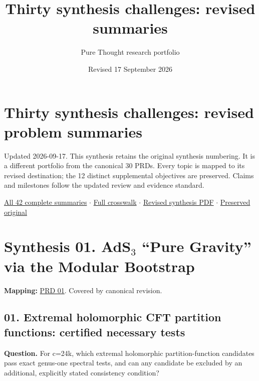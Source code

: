 \documentclass[
  11pt,
]{article}
\title{Thirty synthesis challenges: revised summaries}
\author{Pure Thought research portfolio}
\date{Revised 17 September 2026}
\begin{document}
\maketitle
\thispagestyle{empty}
\clearpage

{
\setcounter{tocdepth}{1}
\tableofcontents
\clearpage
}
\section{Thirty synthesis challenges: revised problem summaries}

Updated 2026-09-17. This synthesis retains the original synthesis
numbering. It is a different portfolio from the canonical 30 PRDs. Every
topic is mapped to its revised destination; the 12 distinct supplemental
objectives are preserved. Claims and milestones follow the updated
review and evidence standard.

\href{https://github.com/rick-stevens-ai/Pure-Thought/blob/main/COMPLETE-PROBLEM-SUMMARIES.md}{All
42 complete summaries} \ensuremath{\cdot}
\href{https://github.com/rick-stevens-ai/Pure-Thought/blob/main/reviews/SYNTHESIS-CROSSWALK.md}{Full
crosswalk} \ensuremath{\cdot}
\href{https://github.com/rick-stevens-ai/Pure-Thought/blob/main/NOTES/30-Pure-Thought-Challenges-Report.pdf}{Revised
synthesis PDF} \ensuremath{\cdot}
\href{https://github.com/rick-stevens-ai/Pure-Thought/blob/main/archive/original-synthesis/30-Most-Compelling-Pure-Thought-AI-Challenges.md}{Preserved
original}

\section{\texorpdfstring{Synthesis 01. AdS\ensuremath{{}_{3}} ``Pure
Gravity'' via the Modular
Bootstrap}{Synthesis 01.  ``Pure Gravity'' via the Modular Bootstrap}}

\textbf{Mapping:}
\href{https://github.com/rick-stevens-ai/Pure-Thought/blob/main/PRDs/01-AdS3-Modular-Bootstrap.md}{PRD
01}. Covered by canonical revision.

\subsection{01. Extremal holomorphic CFT partition functions: certified
necessary tests}

\textbf{Question.} For c=24k, which extremal holomorphic
partition-function candidates pass exact genus-one spectral tests, and
can any candidate be excluded by an additional, explicitly stated
consistency condition?
\end{document}
